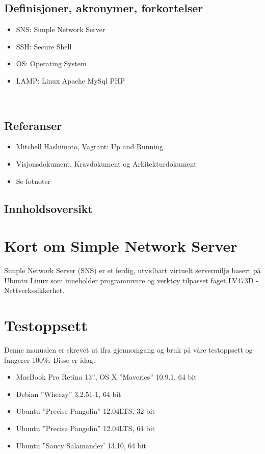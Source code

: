 \documentclass{article}
\begin{document}
\subsection{Definisjoner, akronymer, forkortelser}
\begin{itemize}
\item SNS: Simple Network Server
\item SSH: Secure Shell
\item OS: Operating System
\item LAMP: Linux Apache MySql PHP
\end{itemize}
\\
\subsection{Referanser}
\begin{itemize}
\item{Mitchell Hashimoto, Vagrant: Up and Running}
\item Visjonsdokument, Kravdokument og Arkitekturdokument
\item Se fotnoter
\end{itemize}
\subsection{Innholdsoversikt}
\section{Kort om Simple Network Server}
Simple Network Server (SNS) er et ferdig, utvidbart virtuelt servermiljø basert på Ubuntu Linux som inneholder programmvare og verktøy tilpasset faget LV473D -Nettverkssikkerhet. 
\section{Testoppsett}
Denne manualen er skrevet ut ifra gjennomgang og bruk på våre testoppsett og fungerer 100\%. Disse er idag: 
\begin{itemize}
\item MacBook Pro Retina 13'', OS X  ''Maverics'' 10.9.1, 64 bit
\item Debian ''Wheezy'' 3.2.51-1, 64 bit
\item Ubuntu ''Precise Pangolin'' 12.04LTS, 32 bit
\item Ubuntu ''Precise Pangolin'' 12.04LTS, 64 bit
\item Ubuntu ''Saucy Salamander' 13.10, 64 bit
\end{itemize}
\end{document}
